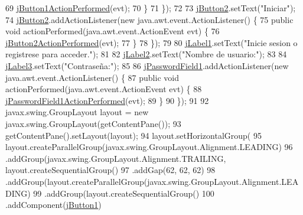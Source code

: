 \begin{DoxyCode}
69                 \mbox{\hyperlink{class_interfaz_package_1_1_interfaz_inicio_a3f0475181f93e77c393fb48e62d06d35}{jButton1ActionPerformed}}(evt);
70             \}
71         \});
72 
73         \mbox{\hyperlink{class_interfaz_package_1_1_interfaz_inicio_a0b17a44506b3f0598b3edabaae5099ec}{jButton2}}.setText(\textcolor{stringliteral}{"Iniciar"});
74         \mbox{\hyperlink{class_interfaz_package_1_1_interfaz_inicio_a0b17a44506b3f0598b3edabaae5099ec}{jButton2}}.addActionListener(\textcolor{keyword}{new} java.awt.event.ActionListener() \{
75             \textcolor{keyword}{public} \textcolor{keywordtype}{void} actionPerformed(java.awt.event.ActionEvent evt) \{
76                 \mbox{\hyperlink{class_interfaz_package_1_1_interfaz_inicio_ad2ad6b62da3001452aabde985ec7b648}{jButton2ActionPerformed}}(evt);
77             \}
78         \});
79 
80         \mbox{\hyperlink{class_interfaz_package_1_1_interfaz_inicio_a6fa5563033504d87402e1abe1b520bc2}{jLabel1}}.setText(\textcolor{stringliteral}{"Inicie sesion o registrese para acceder."});
81 
82         \mbox{\hyperlink{class_interfaz_package_1_1_interfaz_inicio_a57d053ea1c64fdb320d8930aaf4861e9}{jLabel2}}.setText(\textcolor{stringliteral}{"Nombre de usuario:"});
83 
84         \mbox{\hyperlink{class_interfaz_package_1_1_interfaz_inicio_a680b59c8dabd737e6017bcb2fb35d93a}{jLabel3}}.setText(\textcolor{stringliteral}{"Contraseña:"});
85 
86         \mbox{\hyperlink{class_interfaz_package_1_1_interfaz_inicio_a8fde0bb0a462417298eaf6468976a838}{jPasswordField1}}.addActionListener(\textcolor{keyword}{new} java.awt.event.ActionListener() \{
87             \textcolor{keyword}{public} \textcolor{keywordtype}{void} actionPerformed(java.awt.event.ActionEvent evt) \{
88                 \mbox{\hyperlink{class_interfaz_package_1_1_interfaz_inicio_a10646879dd0bce67c6df4ba1f8ddaf64}{jPasswordField1ActionPerformed}}(evt);
89             \}
90         \});
91 
92         javax.swing.GroupLayout layout = \textcolor{keyword}{new} javax.swing.GroupLayout(getContentPane());
93         getContentPane().setLayout(layout);
94         layout.setHorizontalGroup(
95             layout.createParallelGroup(javax.swing.GroupLayout.Alignment.LEADING)
96             .addGroup(javax.swing.GroupLayout.Alignment.TRAILING, layout.createSequentialGroup()
97                 .addGap(62, 62, 62)
98                 .addGroup(layout.createParallelGroup(javax.swing.GroupLayout.Alignment.LEADING)
99                     .addGroup(layout.createSequentialGroup()
100                         .addComponent(\mbox{\hyperlink{class_interfaz_package_1_1_interfaz_inicio_ac4f7e3c32cd3ffd80b806828426752a5}{jButton1}})

\end{DoxyCode}
